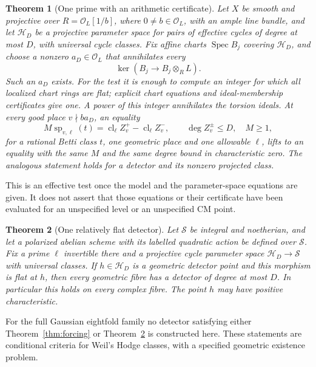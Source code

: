\documentclass[11pt]{article}
\newtheorem{theorem}{Theorem}[section]
\theoremstyle{definition}
\theoremstyle{remark}
\newcommand{\cl}{\operatorname{cl}}
\newcommand{\Spec}{\operatorname{Spec}}
\begin{document}
\begin{theorem}[One prime with an arithmetic certificate]
\label{thm:arithmetic}
Let $X$ be smooth and projective over
$R=\mathcal O_L[1/b]$, where $0\ne b\in\mathcal O_L$, with an ample line bundle, and let
$\mathscr H_D$ be a projective parameter space for pairs of
effective cycles of degree at most $D$, with universal cycle
classes. Fix affine charts $\Spec B_j$ covering $\mathscr H_D$,
and choose a nonzero $a_D\in\mathcal O_L$ that annihilates every
\begin{equation}
 \ker(B_j\longrightarrow B_j\otimes_R L).
 \label{eq:torsion}
\end{equation}
Such an $a_D$ exists. For the test it is enough to compute an
integer for which all localized chart rings are flat; explicit
chart equations and ideal-membership certificates give one.
A power of this integer annihilates the torsion ideals. At every good place
$v\nmid ba_D$, an equality
\begin{equation}
 M\operatorname{sp}_{v,\ell}(t)
   =\cl_\ell Z_v^+-\cl_\ell Z_v^-,\qquad
 \deg Z_v^\pm\leq D,\quad M\geq1,
 \label{eq:oneprime-eq}
\end{equation}
for a rational Betti class $t$, one geometric place and one
allowable $\ell$, lifts to an equality with the same $M$ and the
same degree bound in characteristic zero. The analogous statement
holds for a detector and its nonzero projected class.
\end{theorem}

This is an effective test once the model and the parameter-space
equations are given. It does not assert that those equations or
their certificate have been evaluated for an unspecified level or
an unspecified CM point.

\begin{theorem}[One relatively flat detector]\label{thm:flat}
Let $\mathcal S$ be integral and noetherian, and let a polarized abelian scheme
with its labelled quadratic action be defined over $\mathcal S$.
Fix a prime $\ell$ invertible there and a projective cycle
parameter space $\mathscr H_D\to\mathcal S$ with universal
classes. If $h\in\mathscr H_D$ is a geometric detector point
and this morphism is flat at $h$, then every geometric fibre has
a detector of degree at most $D$. In particular this holds on
every complex fibre. The point $h$ may have positive characteristic.
\end{theorem}

For the full Gaussian eightfold family no detector satisfying
either Theorem~\ref{thm:forcing} or Theorem~\ref{thm:flat} is
constructed here. These statements are conditional criteria for
Weil's Hodge classes, with a specified geometric existence problem.
\end{document}
